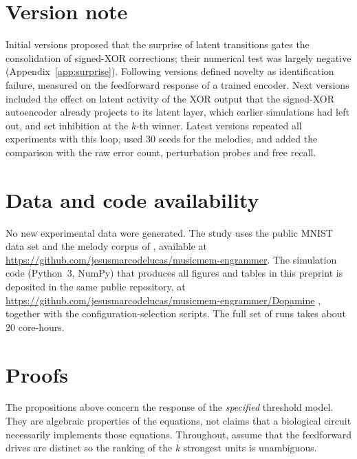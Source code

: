 \documentclass[11pt,a4paper]{article}
\begin{document}
\section*{Version note}
Initial versions proposed that the surprise of latent transitions gates the consolidation of signed-XOR corrections; their numerical test was largely negative (Appendix~\ref{app:surprise}). Following versions defined novelty as identification failure, measured on the feedforward response of a trained encoder. Next versions included the effect on latent activity of the XOR output that the signed-XOR autoencoder already projects to its latent layer, which earlier simulations had left out, and set inhibition at the $k$-th winner. Latest versions repeated all experiments with this loop, used 30 seeds for the melodies, and added the comparison with the raw error count, perturbation probes and free recall. 

\section*{Data and code availability}
No new experimental data were generated. The study uses the public MNIST data set and the melody corpus of \citet{pena2026songs}, available at \url{https://github.com/jesusmarcodelucas/musicmem-engrammer}. The simulation code (Python~3, NumPy) that produces all figures and tables in this preprint is deposited in the same public repository, at \url{https://github.com/jesusmarcodelucas/musicmem-engrammer/Dopamine} , together with the configuration-selection scripts. The full set of runs takes about 20 core-hours.

\appendix
\section{Proofs}\label{app:proofs}
The propositions above concern the response of the \emph{specified} threshold model. They are algebraic properties of the equations, not claims that a biological circuit necessarily implements those equations. Throughout, assume that the feedforward drives are distinct so the ranking of the $k$ strongest units is unambiguous.
\end{document}
